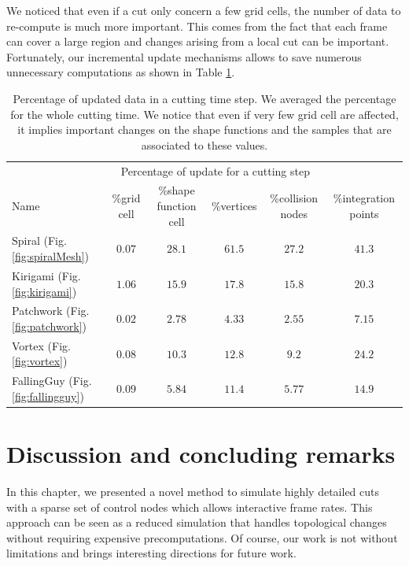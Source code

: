 We noticed that even if a cut only concern a few grid cells, the number of data to re-compute is much more important. This comes from the fact that each frame can cover a large region and changes arising from a local cut can be important. Fortunately, our incremental update mechanisms allows to save numerous unnecessary computations as shown in Table \ref{tab:incrementalUpdate}. 

\begin{table}[!h]
	\centering
	\scalebox{0.7}
	{
		\begin{tabular}{l|ccccc}
			& \multicolumn{4}{c}{Percentage of update for a cutting step} \\
			Name & \%grid cell &\%shape function cell & \%vertices & \%collision nodes & \%integration points \\ \hline
			Spiral (Fig. \ref{fig:spiralMesh}) & $0.07$ & $28.1$ & $61.5$ & $27.2$ & $41.3$\\
			Kirigami (Fig. \ref{fig:kirigami}) & $1.06$ & $15.9$ & $17.8$ & $15.8$ & $20.3$\\
			Patchwork (Fig. \ref{fig:patchwork}) & $0.02$ & $2.78$ & $4.33$ & $2.55$ & $7.15$\\
			Vortex (Fig. \ref{fig:vortex}) & $0.08$ & $10.3$ & $12.8$ & $9.2$ & $24.2$\\
			FallingGuy (Fig. \ref{fig:fallingguy}) & $0.09$ & $5.84$ & $11.4$ & $5.77$ & $14.9$\\
		\end{tabular}
	}
	\caption[Frame-based cutting: Incremental update timings]{\label{tab:incrementalUpdate} Percentage of updated data in a cutting time step. We averaged the percentage for the whole cutting time. We notice that even if very few grid cell are affected, it implies important changes on the shape functions and the samples that are associated to these values.}
\end{table}

\section{Discussion and concluding remarks} 
\label{sec:cutting_conclusion}

In this chapter, we presented a novel method to simulate highly detailed cuts with a sparse set of control nodes which allows interactive frame rates. This approach can be seen as a reduced simulation that handles topological changes without requiring expensive precomputations. Of course, our work is not without limitations and brings interesting directions for future work.

